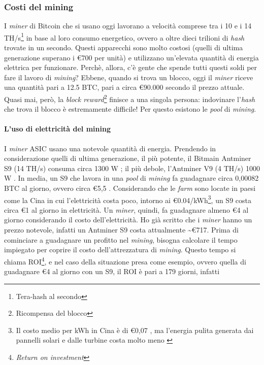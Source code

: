 \documentclass {article}
\begin{document}
\subsubsection {Costi del mining}

I \textit{miner} di Bitcoin che si usano oggi lavorano a velocità comprese tra i 10 e i 14 TH/s\footnote{Tera-hash al secondo} in base al loro consumo energetico, ovvero a oltre dieci trilioni di \textit{hash} trovate in un secondo.
Questi apparecchi sono molto costosi (quelli di ultima generazione superano i \euro{700} per unità) e utilizzano un'elevata quantità di energia elettrica per funzionare.
Perchè, allora, c'è gente che spende tutti questi soldi per fare il lavoro di \textit{mining}?
Ebbene, quando si trova un blocco, oggi il \textit{miner} riceve una quantità pari a 12.5 BTC, pari a circa \euro{90.000} secondo il prezzo attuale.
Quasi mai, però, la \textit{block reward}\footnote{Ricompensa del blocco} finisce a una singola persona: indovinare l'\textit{hash} che trova il blocco è estremamente difficile!
Per questo esistono le \textit{pool} di \textit{mining}.

\paragraph {L'uso di elettricità del mining}

I \textit{miner} ASIC usano una notevole quantità di energia. Prendendo in considerazione quelli di ultima generazione, il più potente, il Bitmain Antminer S9 (14 TH/s) consuma circa 1300 W \cite{antminers9}; il più debole, l'Antminer V9 (4 TH/s) 1000 W \cite{antminerv9}.
In media, un S9 che lavora in una \textit{pool} di \textit{mining} fa guadagnare circa 0,00082 BTC al giorno, ovvero circa \euro{5,5} \cite{s9profit}.
Considerando che le \textit{farm} sono locate in paesi come la Cina in cui l'elettricità costa poco, intorno ai \euro{0.04}/kWh\footnote{Il costo medio per kWh in Cina è di \euro{0,07} \cite{chinaaverage}, ma l'energia pulita generata dai pannelli solari e dalle turbine costa molto meno \cite{chinaless}}, un S9 costa circa \euro{1} al giorno in elettricità.
Un \textit{miner}, quindi, fa guadagnare almeno \euro{4} al giorno considerando il costo dell'elettricità.
Ho già scritto che i \textit{miner} hanno un prezzo notevole, infatti un Antminer S9 costa attualmente \textasciitilde \euro{717}.
Prima di cominciare a guadagnare un profitto nel \textit{mining}, bisogna calcolare il tempo impiegato per coprire il costo dell'attrezzatura di \textit{mining}.
Questo tempo si chiama ROI\footnote{\textit{Return on investment}}, e nel caso della situazione presa come esempio, ovvero quella di guadagnare \euro{4} al giorno con un S9, il ROI è pari a 179 giorni, infatti
\end{document}
